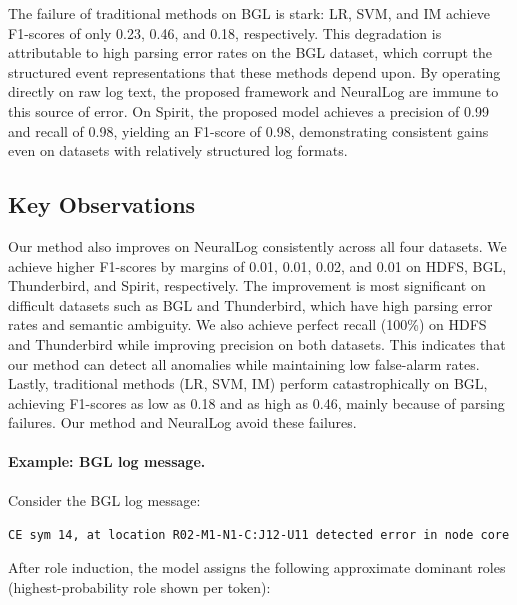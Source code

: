 The failure of traditional methods on BGL is stark: LR, SVM, and IM achieve F1-scores of only 0.23, 0.46, and 0.18, respectively. This degradation is attributable to high parsing error rates on the BGL dataset, which corrupt the structured event representations that these methods depend upon. By operating directly on raw log text, the proposed framework and NeuralLog are immune to this source of error. On Spirit, the proposed model achieves a precision of 0.99 and recall of 0.98, yielding an F1-score of 0.98, demonstrating consistent gains even on datasets with relatively structured log formats.

\subsection{Key Observations}

Our method also improves on NeuralLog consistently across all four datasets. We achieve higher F1-scores by margins of 0.01, 0.01, 0.02, and 0.01 on HDFS, BGL, Thunderbird, and Spirit, respectively. The improvement is most significant on difficult datasets such as BGL and Thunderbird, which have high parsing error rates and semantic ambiguity. We also achieve perfect recall (100\%) on HDFS and Thunderbird while improving precision on both datasets. This indicates that our method can detect all anomalies while maintaining low false-alarm rates. Lastly, traditional methods (LR, SVM, IM) perform catastrophically on BGL, achieving F1-scores as low as 0.18 and as high as 0.46, mainly because of parsing failures. Our method and NeuralLog avoid these failures.

\paragraph{Example: BGL log message.}
Consider the BGL log message:
\begin{center}
\texttt{CE sym 14, at location R02-M1-N1-C:J12-U11 detected error in node core}
\end{center}

After role induction, the model assigns the following approximate dominant roles (highest-probability role shown per token):

